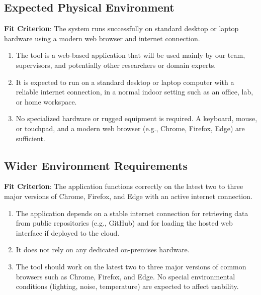 \documentclass[12pt]{article}
\begin{document}
\subsection{Expected Physical Environment}
\textbf{Fit Criterion}: The system runs successfully on standard desktop or laptop hardware using a modern web browser and internet connection.
\begin{enumerate}[label=OE-EPE\arabic*]
\item The tool is a web-based application that will be used mainly by our team, supervisors, and potentially other researchers or domain experts.
\item It is expected to run on a standard desktop or laptop computer with a reliable internet connection, in a normal indoor setting such as an office, lab, or home workspace.
\item No specialized hardware or rugged equipment is required. A keyboard, mouse, or touchpad, and a modern web browser (e.g., Chrome, Firefox, Edge) are sufficient.
\end{enumerate}

\subsection{Wider Environment Requirements}
\textbf{Fit Criterion}: The application functions correctly on the latest two to three major versions of Chrome, Firefox, and Edge with an active internet connection.
\begin{enumerate}[label=OE-WE\arabic*]
\item The application depends on a stable internet connection for retrieving data from public repositories (e.g., GitHub) and for loading the hosted web interface if deployed to the cloud.
\item It does not rely on any dedicated on-premises hardware.
\item The tool should work on the latest two to three major versions of common browsers such as Chrome, Firefox, and Edge. No special environmental conditions (lighting, noise, temperature) are expected to affect usability.
\end{enumerate}
\end{document}

